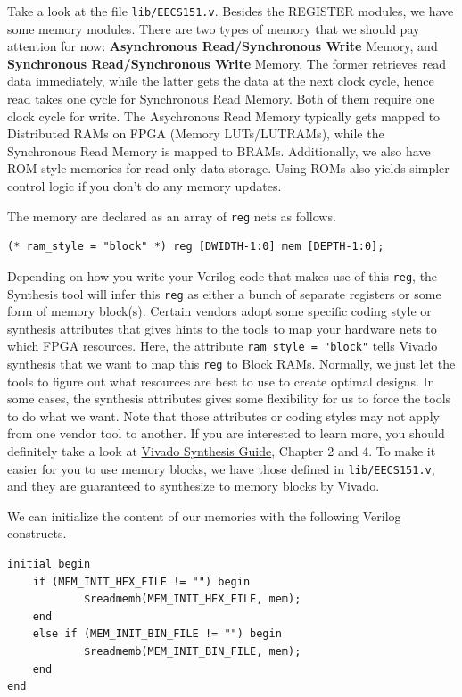 \documentclass[11pt]{article}
\begin{document}
Take a look at the file \verb|lib/EECS151.v|. Besides the REGISTER modules, we have some memory modules. There are two types of memory that we should pay attention for now: \textbf{Asynchronous Read/Synchronous Write} Memory, and \textbf{Synchronous Read/Synchronous Write} Memory. The former retrieves read data immediately, while the latter gets the data at the next clock cycle, hence read takes one cycle for Synchronous Read Memory. Both of them require one clock cycle for write. The Asychronous Read Memory typically gets mapped to Distributed RAMs on FPGA (Memory LUTs/LUTRAMs), while the Synchronous Read Memory is mapped to BRAMs. Additionally, we also have ROM-style memories for read-only data storage. Using ROMs also yields simpler control logic if you don't do any memory updates.

The memory are declared as an array of \verb|reg| nets as follows.

\begin{verbatim}
(* ram_style = "block" *) reg [DWIDTH-1:0] mem [DEPTH-1:0];
\end{verbatim}

Depending on how you write your Verilog code that makes use of this \verb|reg|, the Synthesis tool will infer this \verb|reg| as either a bunch of separate registers or some form of memory block(s). Certain vendors adopt some specific coding style or synthesis attributes that gives hints to the tools to map your hardware nets to which FPGA resources. Here, the attribute \verb|ram_style = "block"| tells Vivado synthesis that we want to map this \verb|reg| to Block RAMs. Normally, we just let the tools to figure out what resources are best to use to create optimal designs. In some cases, the synthesis attributes gives some flexibility for us to force the tools to do what we want. Note that those attributes or coding styles may not apply from one vendor tool to another.
If you are interested to learn more, you should definitely take a look at \href{https://www.xilinx.com/support/documentation/sw_manuals/xilinx2019_2/ug901-vivado-synthesis.pdf}{Vivado Synthesis Guide}, Chapter 2 and 4.
To make it easier for you to use memory blocks, we have those defined in \verb|lib/EECS151.v|, and they are guaranteed to synthesize to memory blocks by Vivado.

We can initialize the content of our memories with the following Verilog constructs.

\begin{verbatim}
initial begin
    if (MEM_INIT_HEX_FILE != "") begin
		    $readmemh(MEM_INIT_HEX_FILE, mem);
    end
    else if (MEM_INIT_BIN_FILE != "") begin
		    $readmemb(MEM_INIT_BIN_FILE, mem);
    end
end
\end{verbatim}
\end{document}
